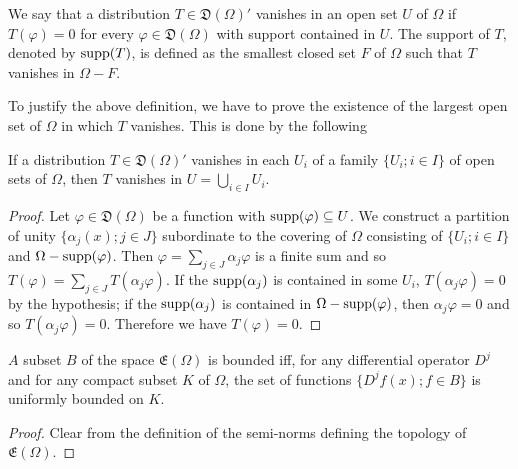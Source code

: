 \label{sec:I.13}

\begin{definition}\label{def:I.13.Definition.1} We say that a distribution $T \in \mathfrak{D}(\Omega)'$ vanishes in an open set $U$ of $\Omega$ if $T(\varphi) = 0$ for every $\varphi \in \mathfrak{D}(\Omega)$ with support contained in $U$. The support of $T$, denoted by $\operatorname{supp}(T)$, is defined as the smallest closed set $F$ of $\Omega$ such that $T$ vanishes in $\Omega- F$. 
\end{definition}

To justify the above definition, we have to prove the existence of the largest open set of $\Omega$ in which $T$ vanishes. This is done by the following 

\begin{theorem}\label{thm:I.13.Theorem.1} If a distribution $T \in \mathfrak{D}(\Omega)'$ vanishes in each $U_i$ of a family $\{U_i; i \in I\}$ of open sets of $\Omega$, then $T$ vanishes in $U = \bigcup\limits_{i \in I} U_i$. 
\end{theorem}

\begin{proof}
 Let $\varphi \in \mathfrak{D}(\Omega)$ be a function with $\operatorname{supp}(\varphi) \subseteq U$. We construct a partition of unity $\{\alpha_j(x); j \in J\}$ subordinate to the covering of $\Omega$ consisting of $\{U_i; i \in I\}$ and $\Omega- \operatorname{supp}(\varphi)$. Then $\varphi = \sum\limits_{j \in J} \alpha_j \varphi$ is a finite sum and so $T(\varphi) = \sum\limits_{j \in J} T(\alpha_j \varphi)$. If the $\operatorname{supp}(\alpha_j)$ is contained in some $U_i$, $T(\alpha_j \varphi) = 0$ by the hypothesis; if the $\operatorname{supp}(\alpha_j)$ is contained in $\Omega- \operatorname{supp}(\varphi)$, then $\alpha_j \varphi = 0$ and so $T(\alpha_j \varphi) = 0$. Therefore we have $T(\varphi) = 0$. 
\end{proof}

\begin{proposition}\label{prop:I.13.Proposition.1} $A$ subset $B$ of the space $\mathfrak{E}(\Omega)$ is bounded iff, for any differential operator $D^{j}$ and for any compact subset $K$ of $\Omega$, the set of functions $\{D^{j}f(x); f \in B\}$ is uniformly bounded on $K$. 
\end{proposition}

\begin{proof}
 Clear from the definition of the semi-norms defining the topology of $\mathfrak{E}(\Omega)$. 
\end{proof}

